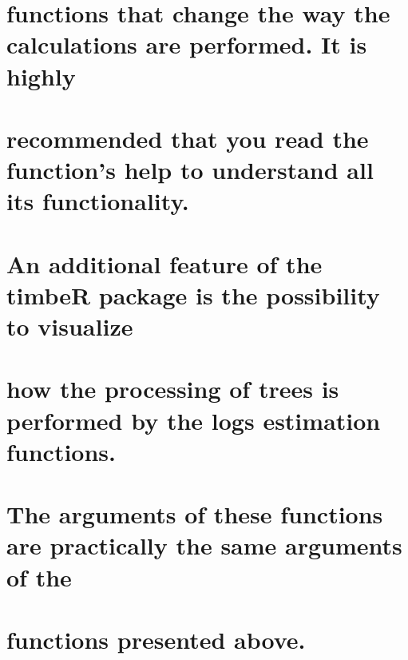 \documentclass[
]{article}
\begin{document}
\hypertarget{functions-that-change-the-way-the-calculations-are-performed.-it-is-highly}{%
\section{functions that change the way the calculations are performed.
It is
highly}\label{functions-that-change-the-way-the-calculations-are-performed.-it-is-highly}}

\hypertarget{recommended-that-you-read-the-functions-help-to-understand-all-its-functionality.}{%
\section{recommended that you read the function's help to understand all
its
functionality.}\label{recommended-that-you-read-the-functions-help-to-understand-all-its-functionality.}}

\hypertarget{an-additional-feature-of-the-timber-package-is-the-possibility-to-visualize}{%
\section{An additional feature of the timbeR package is the possibility
to
visualize}\label{an-additional-feature-of-the-timber-package-is-the-possibility-to-visualize}}

\hypertarget{how-the-processing-of-trees-is-performed-by-the-logs-estimation-functions.}{%
\section{how the processing of trees is performed by the logs estimation
functions.}\label{how-the-processing-of-trees-is-performed-by-the-logs-estimation-functions.}}

\hypertarget{the-arguments-of-these-functions-are-practically-the-same-arguments-of-the}{%
\section{The arguments of these functions are practically the same
arguments of
the}\label{the-arguments-of-these-functions-are-practically-the-same-arguments-of-the}}

\hypertarget{functions-presented-above.}{%
\section{functions presented above.}\label{functions-presented-above.}}
\end{document}
